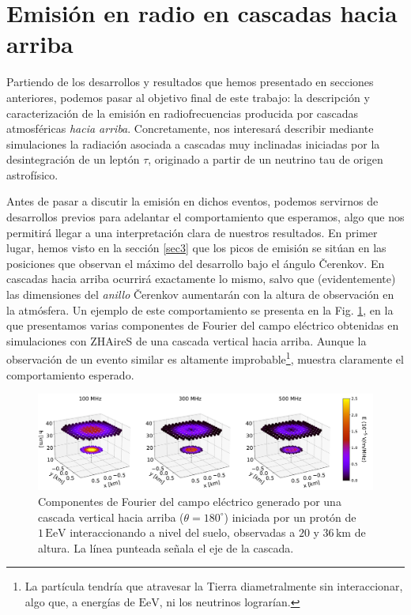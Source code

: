 \documentclass[11 pt, a4paper]{article} %
\numberwithin{equation}{section}
\numberwithin{figure}{section}
\numberwithin{table}{section}
\begin{document}
	\section{Emisión en radio en cascadas hacia arriba}
	Partiendo de los desarrollos y resultados que hemos presentado en secciones anteriores, podemos pasar al objetivo final de este trabajo: la descripción y caracterización de la emisión en radiofrecuencias producida por cascadas atmosféricas \textit{hacia arriba}. Concretamente, nos interesará describir mediante simulaciones la radiación asociada a cascadas muy inclinadas iniciadas por la desintegración de un leptón $\tau$, originado a partir de un neutrino tau de origen astrofísico.  
	
	Antes de pasar a discutir la emisión en dichos eventos, podemos servirnos de desarrollos previos para adelantar el comportamiento que esperamos, algo que nos permitirá llegar a una interpretación clara de nuestros resultados. En primer lugar, hemos visto en la sección \ref{sec3} que los picos de emisión se sitúan en las posiciones que observan el máximo del desarrollo bajo el ángulo \v{C}erenkov. En cascadas hacia arriba ocurrirá exactamente lo mismo, salvo que (evidentemente) las dimensiones del \textit{anillo} \v{C}erenkov aumentarán con la altura de observación en la atmósfera. Un ejemplo de este comportamiento se presenta en la Fig. \ref{Comparativa_20_36km}, en la que presentamos varias componentes de Fourier del campo eléctrico obtenidas en simulaciones con ZHAireS de una cascada vertical hacia arriba. Aunque la observación de un evento similar es altamente improbable\footnote{ La partícula tendría que atravesar la Tierra diametralmente sin interaccionar, algo que, a energías de $\mathrm{EeV}$, ni los neutrinos lograrían.}, muestra claramente el comportamiento esperado.
	\begin{figure}[H]
		\centering
		\includegraphics[width=1.\linewidth]{figures/Radio_UG/Comparativa_20_36km}
		\caption{Componentes de Fourier del campo eléctrico generado por una cascada vertical hacia arriba ($\theta=180^\circ$) iniciada por un protón de $1\,\mathrm{EeV}$ interaccionando a nivel del suelo, observadas a $20$ y $36\,\mathrm{km}$ de altura. La línea punteada señala el eje de la cascada.}
		\label{Comparativa_20_36km}
	\end{figure}
\end{document}
